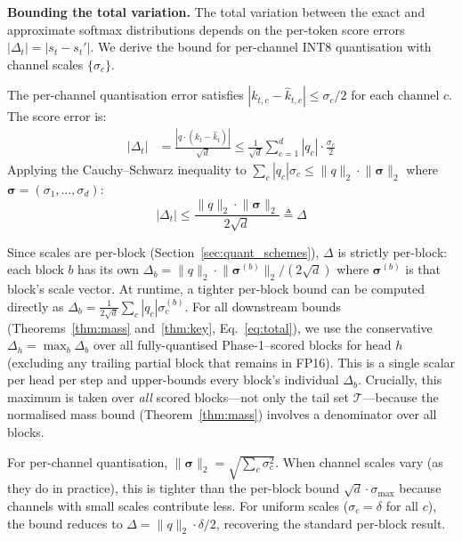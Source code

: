 \documentclass[10pt,twocolumn,a4paper]{article}
\theoremstyle{definition}
\theoremstyle{remark}
\newcommand{\norm}[1]{\lVert #1 \rVert}
\begin{document}
\textbf{Bounding the total variation.}  The total variation between the exact and approximate softmax distributions depends on the per-token score errors $|\Delta_t| = |s_t - s_t'|$.  We derive the bound for per-channel INT8 quantisation with channel scales $\{\sigma_c\}$.

The per-channel quantisation error satisfies $|k_{t,c} - \hat{k}_{t,c}| \leq \sigma_c / 2$ for each channel $c$.  The score error is:
\begin{align*}
  |\Delta_t| &= \frac{|q \cdot (k_t - \hat{k}_t)|}{\sqrt{d}} \leq \frac{1}{\sqrt{d}} \sum_{c=1}^d |q_c| \cdot \frac{\sigma_c}{2}
\end{align*}
Applying the Cauchy--Schwarz inequality to $\sum_c |q_c| \sigma_c \leq \norm{q}_2 \cdot \norm{\boldsymbol{\sigma}}_2$ where $\boldsymbol{\sigma} = (\sigma_1, \ldots, \sigma_d)$:
\begin{equation}
\label{eq:delta}
  |\Delta_t| \leq \frac{\norm{q}_2 \cdot \norm{\boldsymbol{\sigma}}_2}{2\sqrt{d}} \triangleq \Delta
\end{equation}

Since scales are per-block (Section~\ref{sec:quant_schemes}), $\Delta$ is strictly per-block: each block $b$ has its own $\Delta_b = \norm{q}_2 \cdot \norm{\boldsymbol{\sigma}^{(b)}}_2 / (2\sqrt{d})$ where $\boldsymbol{\sigma}^{(b)}$ is that block's scale vector.  At runtime, a tighter per-block bound can be computed directly as $\Delta_b = \frac{1}{2\sqrt{d}} \sum_c |q_c| \sigma_c^{(b)}$.  For all downstream bounds (Theorems~\ref{thm:mass} and~\ref{thm:key}, Eq.~\ref{eq:total}), we use the conservative $\Delta_h = \max_{b} \Delta_b$ over all fully-quantised Phase-1--scored blocks for head $h$ (excluding any trailing partial block that remains in FP16).  This is a single scalar per head per step and upper-bounds every block's individual $\Delta_b$.  Crucially, this maximum is taken over \emph{all} scored blocks---not only the tail set $\mathcal{T}$---because the normalised mass bound (Theorem~\ref{thm:mass}) involves a denominator over all blocks.

For per-channel quantisation, $\norm{\boldsymbol{\sigma}}_2 = \sqrt{\sum_c \sigma_c^2}$.  When channel scales vary (as they do in practice), this is tighter than the per-block bound $\sqrt{d} \cdot \sigma_{\max}$ because channels with small scales contribute less.  For uniform scales ($\sigma_c = \delta$ for all $c$), the bound reduces to $\Delta = \norm{q}_2 \cdot \delta / 2$, recovering the standard per-block result.
\end{document}
